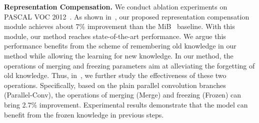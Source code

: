 \documentclass[10pt,twocolumn,letterpaper]{article}
\begin{document}
\textbf{Representation Compensation.}
We conduct ablation experiments on PASCAL VOC 2012~\cite{pascal-voc-2012}.
As shown in~,
our proposed representation compensation module achieves about 7\% improvement than the MiB~\cite{mib} baseline.
With this module,
our method reaches state-of-the-art performance.
We argue this performance benefits from the scheme of remembering old knowledge in our method while allowing the learning for new knowledge.
In our method,
the operations of merging and freezing parameters aim at alleviating the forgetting of old knowledge.
Thus,
in~,
we further study the effectiveness of these two operations.
Specifically, 
based on the plain parallel convolution branches (Parallel-Conv),
the operations of merging (Merge) and freezing (Frozen) can bring 2.7\% improvement. 
Experimental results demonstrate that
the model can benefit from the frozen knowledge in previous steps.
\end{document}
